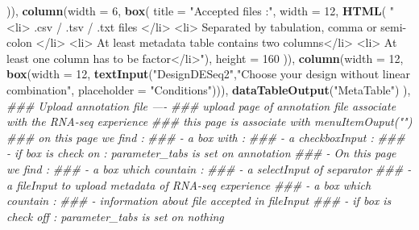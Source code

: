 \documentclass[
  12pt,
]{article}
\newenvironment{Shaded}{\begin{snugshade}}{\end{snugshade}}
\newcommand{\CommentTok}[1]{\textcolor[rgb]{0.56,0.35,0.01}{\textit{#1}}}
\newcommand{\DataTypeTok}[1]{\textcolor[rgb]{0.13,0.29,0.53}{#1}}
\newcommand{\DecValTok}[1]{\textcolor[rgb]{0.00,0.00,0.81}{#1}}
\newcommand{\KeywordTok}[1]{\textcolor[rgb]{0.13,0.29,0.53}{\textbf{#1}}}
\newcommand{\NormalTok}[1]{#1}
\newcommand{\StringTok}[1]{\textcolor[rgb]{0.31,0.60,0.02}{#1}}
\begin{document}
\begin{Shaded}
\begin{Highlighting}[]
\NormalTok{                           )),}
                    \KeywordTok{column}\NormalTok{(}\DataTypeTok{width =} \DecValTok{6}\NormalTok{,}
                           \KeywordTok{box}\NormalTok{(}
                             \DataTypeTok{title =} \StringTok{"Accepted files :"}\NormalTok{, }\DataTypeTok{width =} \DecValTok{12}\NormalTok{,}
                             \KeywordTok{HTML}\NormalTok{(}
                               \StringTok{"<li> .csv / .tsv / .txt files </li>}
\StringTok{                               <li> Separated by tabulation, comma or semi-colon </li>}
\StringTok{                               <li> At least metadata table contains two columns</li>}
\StringTok{                               <li> At least one column has to be factor</li>"}\NormalTok{),}
                             \DataTypeTok{height =} \DecValTok{160}
\NormalTok{                             )),}
                    \KeywordTok{column}\NormalTok{(}\DataTypeTok{width =} \DecValTok{12}\NormalTok{,}
                           \KeywordTok{box}\NormalTok{(}\DataTypeTok{width =} \DecValTok{12}\NormalTok{,}
                               \KeywordTok{textInput}\NormalTok{(}\StringTok{"DesignDESeq2"}\NormalTok{,}\StringTok{"Choose your design without linear combination"}\NormalTok{, }
                                         \DataTypeTok{placeholder =} \StringTok{"Conditions"}\NormalTok{))),}
                    \KeywordTok{dataTableOutput}\NormalTok{(}\StringTok{"MetaTable"}\NormalTok{)}
\NormalTok{                    ),}
            \CommentTok{### Upload annotation file ----}
            \CommentTok{### upload page of annotation file associate with the RNA-seq experience}
            \CommentTok{### this page is associate with menuItemOuput("")}
            \CommentTok{### on this page we find :}
            \CommentTok{###   - a box with :}
            \CommentTok{###       - a checkboxInput :  }
            \CommentTok{###            - if box is check on : parameter_tabs is set on annotation}
            \CommentTok{###               - On this page we find :}
            \CommentTok{###                   - a box which countain :}
            \CommentTok{###                       - a selectInput of separator }
            \CommentTok{###                       - a fileInput to upload metadata of RNA-seq experience}
            \CommentTok{###                   - a box which countain :}
            \CommentTok{###                       - information about file accepted in fileInput}
            \CommentTok{###            - if box is check off : parameter_tabs is set on nothing}

\end{Highlighting}
\end{Shaded}
\end{document}
